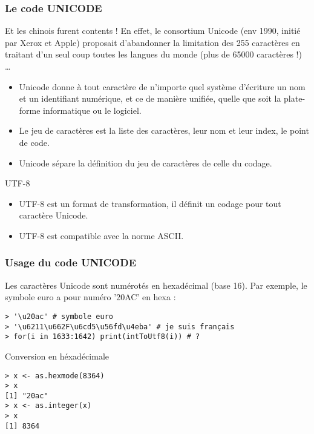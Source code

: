 \documentclass[10pt]{beamer}
\begin{document}
\begin{frame}
  \frametitle{Le code UNICODE}
Et les chinois furent contents ! En effet, le consortium \alert{Unicode} (env 1990, initié par Xerox et Apple) proposait d'abandonner la limitation des 255 caractères en traitant d'un seul coup toutes les
langues du monde (plus de 65000 caractères !) \dots
    \begin{itemize}
    \item \alert{Unicode} donne à tout caractère de n’importe quel système d'écriture un nom et un identifiant numérique, et ce de manière unifiée, quelle que soit la plate-forme informatique ou le logiciel.
    \item Le jeu de caractères est la liste des caractères, leur nom et leur index, le point de code.
    \item<alert@1> Unicode sépare la définition du jeu de caractères de celle du codage.   
    \end{itemize}

  \begin{block}{UTF-8}
    \begin{itemize}
    \item \alert{UTF-8 est un format de transformation}, il définit un codage pour tout caractère Unicode.
    \item<alert@1> UTF-8 est compatible avec la norme ASCII.
    \end{itemize}
  \end{block}

\end{frame}


\begin{frame}[fragile]
  \frametitle{Usage du code UNICODE}
  Les caractères Unicode sont numérotés en hexadécimal (base 16).
  Par exemple, le symbole euro a pour numéro '20AC' en hexa :
  \begin{lstlisting}
> '\u20ac' # symbole euro 
> '\u6211\u662F\u6cd5\u56fd\u4eba' # je suis français
> for(i in 1633:1642) print(intToUtf8(i)) # ?
\end{lstlisting}

\begin{exampleblock}{Conversion en héxadécimale}
\begin{lstlisting}[style=block]
> x <- as.hexmode(8364)
> x
[1] "20ac"
> x <- as.integer(x)
> x
[1] 8364  
\end{lstlisting}
\end{exampleblock}
\end{frame}
\end{document}
